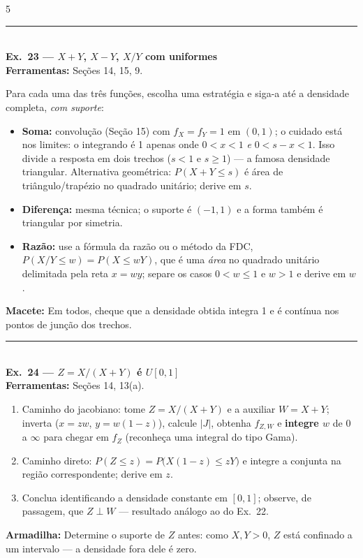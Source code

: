 \documentclass[a4paper,8pt]{extarticle}
\newcommand{\tit}[1]{\vspace{2pt}\textcolor{azul}{\rule{\linewidth}{0.6pt}}\\[1pt]\textbf{\textcolor{azul}{#1}}\\[1pt]}
\newcommand{\mac}[1]{\textcolor{verde}{\textbf{Macete:}} #1\par}
\newcommand{\arm}[1]{\textcolor{vinho}{\textbf{Armadilha:}} #1\par}
\newcommand{\ferr}[1]{\textbf{Ferramentas:} #1\par}
\begin{document}
\begin{multicols*}{5}
\tit{Ex.\ 23 — $X+Y$, $X-Y$, $X/Y$ com uniformes}
\ferr{Seções 14, 15, 9.}
Para cada uma das três funções, escolha uma estratégia e siga-a até a densidade completa, \emph{com suporte}:
\begin{itemize}
\item \textbf{Soma:} convolução (Seção 15) com $f_X=f_Y=1$ em $(0,1)$; o cuidado está nos limites: o integrando é 1 apenas onde $0<x<1$ \emph{e} $0<s-x<1$. Isso divide a resposta em dois trechos ($s<1$ e $s\ge1$) — a famosa densidade triangular. Alternativa geométrica: $P(X+Y\le s)$ é área de triângulo/trapézio no quadrado unitário; derive em $s$.
\item \textbf{Diferença:} mesma técnica; o suporte é $(-1,1)$ e a forma também é triangular por simetria.
\item \textbf{Razão:} use a fórmula da razão ou o método da FDC, $P(X/Y\le w)=P(X\le wY)$, que é uma \emph{área} no quadrado unitário delimitada pela reta $x=wy$; separe os casos $0<w\le1$ e $w>1$ e derive em $w$.
\end{itemize}
\mac{Em todos, cheque que a densidade obtida integra 1 e é contínua nos pontos de junção dos trechos.}

\tit{Ex.\ 24 — $Z=X/(X+Y)$ é $U[0,1]$}
\ferr{Seções 14, 13(a).}
\begin{enumerate}
\item Caminho do jacobiano: tome $Z=X/(X+Y)$ e a auxiliar $W=X+Y$; inverta ($x=zw$, $y=w(1-z)$), calcule $|J|$, obtenha $f_{Z,W}$ e \textbf{integre $w$} de 0 a $\infty$ para chegar em $f_Z$ (reconheça uma integral do tipo Gama).
\item Caminho direto: $P(Z\le z)=P\big(X(1-z)\le zY\big)$ e integre a conjunta na região correspondente; derive em $z$.
\item Conclua identificando a densidade constante em $[0,1]$; observe, de passagem, que $Z\perp W$ — resultado análogo ao do Ex.\ 22.
\end{enumerate}
\arm{Determine o suporte de $Z$ antes: como $X,Y>0$, $Z$ está confinado a um intervalo — a densidade fora dele é zero.}


\end{multicols*}
\end{document}
